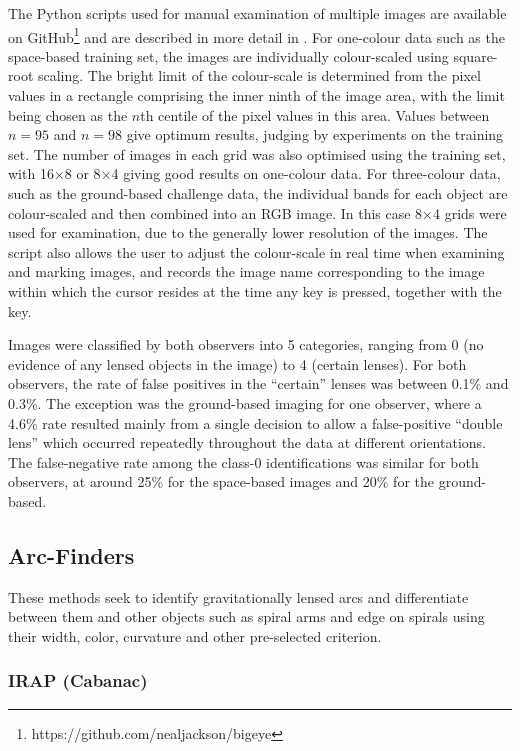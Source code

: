 \documentclass[useAMS,usenatbib]{mnras}
\begin{document}
The Python scripts used for manual examination of multiple images are available
on GitHub\footnote{https://github.com/nealjackson/bigeye} and are described in more detail
in \citet{hartley2017support}. For one-colour data such as
the space-based training set, the images are individually colour-scaled using
square-root scaling. The bright limit of the colour-scale is determined
from the pixel values in a rectangle comprising the inner ninth of the
image area, with the limit being chosen as the $n$th centile of the pixel
values in this area. Values between $n=95$ and $n=98$ give optimum results,
judging by experiments on the training set. The number of images in each
grid was also optimised using the training set, with 16$\times$8 or 
8$\times$4 giving good results on one-colour data. For three-colour data,
such as the ground-based challenge data, the individual bands for each 
object are colour-scaled and then combined into an RGB image. In this case
8$\times$4 grids were used for examination, due to the generally lower 
resolution of the images. The script also allows the user to adjust the
colour-scale in real time when examining and marking images, and records
the image name corresponding to the image within which the cursor resides
at the time any key is pressed, together with the key.

Images were classified by both observers into 5 categories, ranging from
0 (no evidence of any lensed objects in the image) to 4 (certain lenses).
For both observers, the rate of false positives in the ``certain'' lenses
was between 0.1\% and 0.3\%. The exception was the ground-based imaging 
for one observer, where a 4.6\% rate resulted mainly from a
single decision to allow a false-positive ``double lens'' which occurred
repeatedly throughout the data at different orientations. The false-negative
rate among the class-0 identifications was similar for both observers, at
around 25\% for the space-based images and 20\% for the ground-based.

\subsection{Arc-Finders}

These methods seek to identify gravitationally lensed arcs and differentiate between them and 
other objects such as spiral arms and edge on spirals using their width, color, curvature and other pre-selected criterion.

\subsubsection{ IRAP (Cabanac)}
\end{document}
